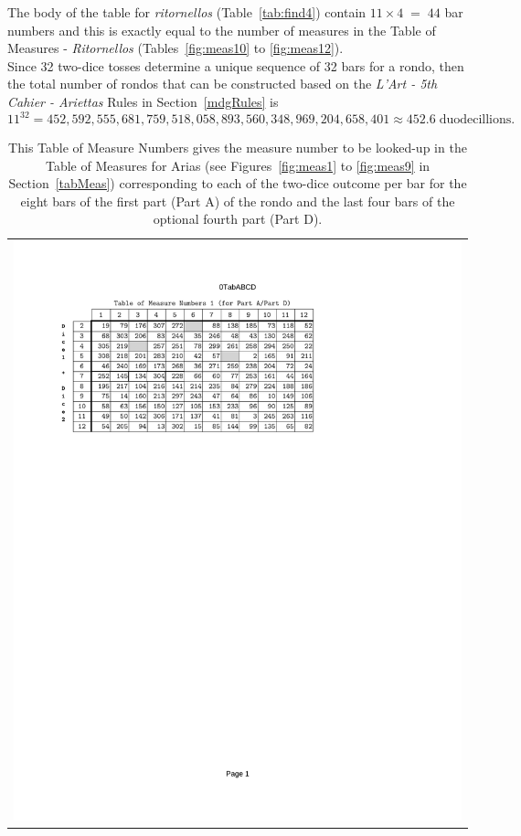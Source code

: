 \documentclass[a4paper,x11names,svgnames,10pt]{article}
\begin{document}
{The body of the table for {\it ritornellos} (Table~\ref{tab:find4}) contain $11 \times 4 \;=\; 44$ bar numbers and this is exactly equal to the number of measures in the Table of Measures - {\it Ritornellos} (Tables~\ref{fig:meas10} to \ref{fig:meas12}).\\

Since 32 two-dice tosses determine a unique sequence of 32 bars for a rondo, then the total number of rondos that can be constructed based on the {\em L'Art - 5th Cahier - Ariettas} Rules in Section~\ref{mdgRules} is $$11^{32} = 452\!,592\!,555\!,681\!,759\!,518\!,058\!,893\!,560\!,348\!,969\!,204\!,658\!,401 \approx 452.6\; \text{duodecillions}.$$


\begin{table}[H]
	\centering
	\begin{tabular}{c}
		\centering
		\includegraphics[clip=true,trim=0.75in 7.30in 2.50in 1.10in,scale=0.90]{0TAB-AD}
	\end{tabular}
	\caption{This Table of Measure Numbers gives the measure number to be looked-up in the Table of Measures for Arias (see Figures~\ref{fig:meas1} to \ref{fig:meas9} in Section~\ref{tabMeas}) corresponding to each of the two-dice outcome per bar for the eight bars of the first part (Part A) of the rondo and the last four bars of the optional fourth part (Part D).}
	\label{tab:find1}
\end{table}

}
\end{document}

